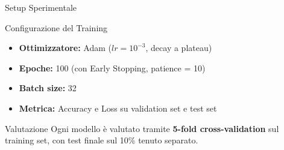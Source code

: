 \documentclass[9pt,serif,usenames,dvipsnames]{beamer}
\begin{document}
\begin{frame}{\centering Setup Sperimentale}
    \begin{block}{Configurazione del Training}
        \begin{itemize}
            \item \textbf{Ottimizzatore:} Adam ($lr = 10^{-3}$, decay a plateau)
            \item \textbf{Epoche:} 100 (con Early Stopping, patience = 10)
            \item \textbf{Batch size:} 32
            \item \textbf{Metrica:} Accuracy e Loss su validation set e test set
        \end{itemize}
    \end{block}

    \vspace{0.2cm}

    \begin{alertblock}{Valutazione}
        Ogni modello è valutato tramite \textbf{5-fold cross-validation}
        sul training set, con test finale sul 10\% tenuto separato.
    \end{alertblock}
\end{frame}
\end{document}
